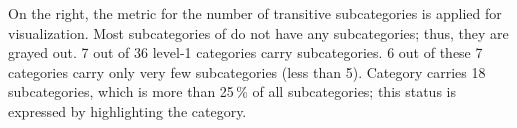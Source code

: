On the right, the metric for the number of transitive subcategories is applied for visualization. Most subcategories of  do not have any subcategories; thus, they are grayed out. 7 out of 36 level-1 categories carry subcategories. 6 out of these 7 categories carry only very few subcategories (less than 5). Category  carries 18 subcategories, which is more than 25\,\% of all subcategories; this status is expressed by highlighting the category.

